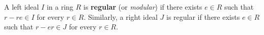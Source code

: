 A left ideal $I$ in a ring $R$ is \textbf{regular} (or \textit{modular}) if there exists $e \in R$ such that $r - re \in I$ for every $r \in R$. Similarly, a right ideal $J$ is regular if there exists $e \in R$ such that $r - er \in J$ for every $r \in R$.
